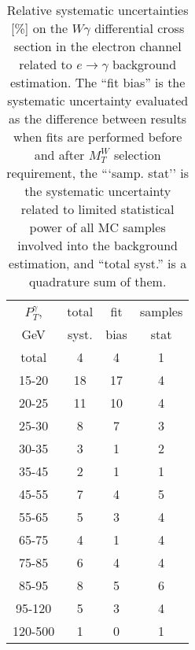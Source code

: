 \begin{table}[h]
  \scriptsize
  \begin{center}
  \caption{Relative systematic uncertainties [\%] on the $W\gamma$ differential cross section in the electron channel related to $e\rightarrow\gamma$ background estimation. The ``fit bias'' is the systematic uncertainty evaluated as the difference between results when fits are performed before and after $M_T^{W}$ selection requirement, the ```samp. stat'' is the systematic uncertainty related to limited statistical power of all MC samples involved into the background estimation, and ``total syst.'' is a quadrature sum of them. }
  \begin{tabular}{|c|c|c|c|}
    $P_T^{\gamma}$,  & total & fit  & samples\\
    GeV  & syst. & bias & stat\\ \hline
    total  & 4 & 4 & 1 \\ \hline
    15-20 & 18 & 17 & 4 \\ \hline
    20-25 & 11 & 10 & 4 \\ \hline
    25-30 & 8 & 7 & 3 \\ \hline
    30-35 & 3 & 1 & 2 \\ \hline
    35-45 & 2 & 1 & 1 \\ \hline
    45-55 & 7 & 4 & 5 \\ \hline
    55-65 & 5 & 3 & 4 \\ \hline
    65-75 & 4 & 1 & 4 \\ \hline
    75-85 & 6 & 4 & 4 \\ \hline
    85-95 & 8 & 5 & 6 \\ \hline
    95-120 & 5 & 3 & 4 \\ \hline
    120-500 & 1 & 0 & 1 \\ \hline
  \end{tabular}
  \label{tab:systInPercentEtogamma_ELECTRON_WGamma}
  \end{center}
\end{table}


